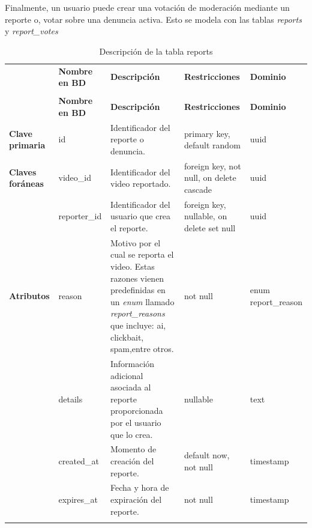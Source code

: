 
Finalmente, un usuario puede crear una votación de moderación mediante un reporte o, votar sobre una denuncia activa. Esto se modela con las tablas \textit{reports} y \textit{report\_votes}


\renewcommand{\arraystretch}{1.35}
\setlength{\tabcolsep}{3pt}
\small

\begin{longtable}{|
>{\raggedright\arraybackslash}p{1.9cm}|
>{\raggedright\arraybackslash}p{2.7cm}|
>{\raggedright\arraybackslash}p{4.9cm}|
>{\raggedright\arraybackslash}p{2.7cm}|
>{\raggedright\arraybackslash}p{2.1cm}|
}
\hline

\rowcolor[gray]{0.75}
\multicolumn{5}{|c|}{\textbf{Reportes}} \\
\hline

 & \textbf{Nombre en BD} & \textbf{Descripción} & \textbf{Restricciones} & \textbf{Dominio} \\
\hline
\endfirsthead

\hline
\rowcolor[gray]{0.75}
\multicolumn{5}{|c|}{\textbf{Reportes}} \\
\hline

 & \textbf{Nombre en BD} & \textbf{Descripción} & \textbf{Restricciones} & \textbf{Dominio} \\
\hline
\endhead

\textbf{Clave primaria}
& id
& Identificador del reporte o denuncia.
& primary key, default random
& uuid \\
\hline

\textbf{Claves foráneas}
& video\_\allowbreak id
& Identificador del video reportado.
& foreign key, not null, on delete cascade
& uuid \\
\cline{2-5}

& reporter\_\allowbreak id
& Identificador del usuario que crea el reporte.
& foreign key, nullable, on delete set null
& uuid \\
\hline

\textbf{Atributos}
& reason
& Motivo por el cual se reporta el video. Estas razones vienen predefinidas en un \textit{enum} llamado \textit{report\_reasons} que incluye: ai, clickbait, spam,entre otros.
& not null
& enum report\_\allowbreak reason \\
\cline{2-5}

& details
& Información adicional asociada al reporte proporcionada por el usuario que lo crea.
& nullable
& text \\
\cline{2-5}

& created\_\allowbreak at
& Momento de creación del reporte.
& default now, not null
& timestamp \\
\cline{2-5}

& expires\_\allowbreak at
& Fecha y hora de expiración del reporte. 
& not null
& timestamp \\
\hline

\caption{Descripción de la tabla reports}
\end{longtable}


